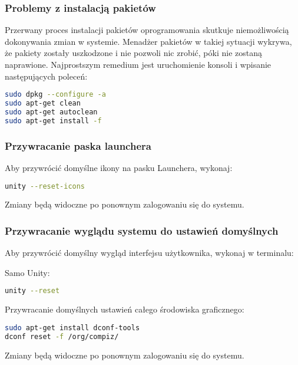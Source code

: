 \subsubsection{Problemy z instalacją pakietów}
Przerwany proces instalacji pakietów oprogramowania skutkuje niemożliwością dokonywania zmian w systemie. Menadżer pakietów w takiej sytuacji wykrywa, że pakiety zostały uszkodzone i nie pozwoli nic zrobić, póki nie zostaną naprawione. Najprostszym remedium jest uruchomienie konsoli  i wpisanie następujących poleceń:

\begin{lstlisting}[language=bash]
sudo dpkg --configure -a
sudo apt-get clean
sudo apt-get autoclean
sudo apt-get install -f
\end{lstlisting}
\clearpage
\subsubsection{Przywracanie paska launchera}
Aby przywrócić domyślne ikony na pasku Launchera, wykonaj:

\begin{lstlisting}[language=bash]
unity --reset-icons
\end{lstlisting}

Zmiany będą widoczne po ponownym zalogowaniu się do systemu.

\subsubsection{Przywracanie wyglądu systemu do ustawień domyślnych}
\label{unity_reset} \noindent Aby przywrócić domyślny wygląd interfejsu użytkownika, wykonaj w terminalu:

\noindent Samo Unity:
\begin{lstlisting}[language=bash]
unity --reset
\end{lstlisting}

\noindent Przywracanie domyślnych ustawień całego środowiska graficznego:

\begin{lstlisting}[language=bash]
sudo apt-get install dconf-tools
dconf reset -f /org/compiz/
\end{lstlisting}

\noindent Zmiany będą widoczne po ponownym zalogowaniu się do systemu.
\clearpage
